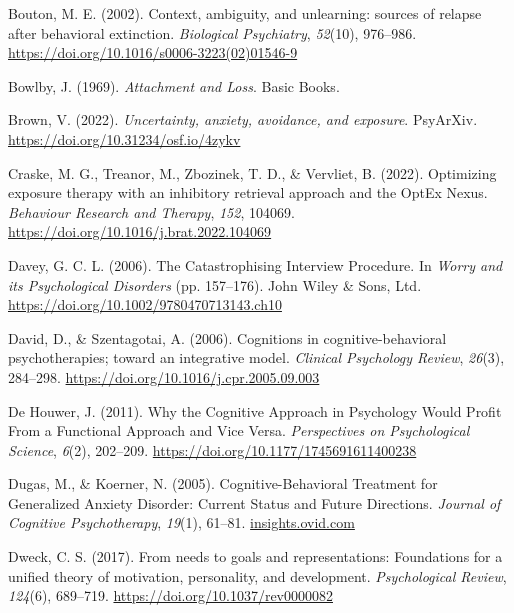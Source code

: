 \documentclass[
  man,floatsintext]{apa7}
\newlength{\cslhangindent}
\newlength{\cslentryspacingunit} %
\newenvironment{CSLReferences}[2] %
 {%
  \setlength{\parindent}{0pt}
  \ifodd #1
  \let\oldpar\par
  \def\par{\hangindent=\cslhangindent\oldpar}
  \fi
  \setlength{\parskip}{#2\cslentryspacingunit}
 }%
 {}
\begin{document}
\begin{CSLReferences}{1}{0}
\leavevmode{}%
Bouton, M. E. (2002). Context, ambiguity, and unlearning: sources of relapse after behavioral extinction. \emph{Biological Psychiatry}, \emph{52}(10), 976--986. \url{https://doi.org/10.1016/s0006-3223(02)01546-9}

\leavevmode{}%
Bowlby, J. (1969). \emph{Attachment and Loss}. Basic Books.

\leavevmode{}%
Brown, V. (2022). \emph{Uncertainty, anxiety, avoidance, and exposure}. PsyArXiv. \url{https://doi.org/10.31234/osf.io/4zykv}

\leavevmode{}%
Craske, M. G., Treanor, M., Zbozinek, T. D., \& Vervliet, B. (2022). Optimizing exposure therapy with an inhibitory retrieval approach and the OptEx Nexus. \emph{Behaviour Research and Therapy}, \emph{152}, 104069. \url{https://doi.org/10.1016/j.brat.2022.104069}

\leavevmode{}%
Davey, G. C. L. (2006). The Catastrophising Interview Procedure. In \emph{Worry and its Psychological Disorders} (pp. 157--176). John Wiley \& Sons, Ltd. \url{https://doi.org/10.1002/9780470713143.ch10}

\leavevmode{}%
David, D., \& Szentagotai, A. (2006). Cognitions in cognitive-behavioral psychotherapies; toward an integrative model. \emph{Clinical Psychology Review}, \emph{26}(3), 284--298. \url{https://doi.org/10.1016/j.cpr.2005.09.003}

\leavevmode{}%
De Houwer, J. (2011). Why the Cognitive Approach in Psychology Would Profit From a Functional Approach and Vice Versa. \emph{Perspectives on Psychological Science}, \emph{6}(2), 202--209. \url{https://doi.org/10.1177/1745691611400238}

\leavevmode{}%
Dugas, M., \& Koerner, N. (2005). Cognitive-Behavioral Treatment for Generalized Anxiety Disorder: Current Status and Future Directions. \emph{Journal of Cognitive Psychotherapy}, \emph{19}(1), 61--81. \href{https://insights.ovid.com}{insights.ovid.com}

\leavevmode{}%
Dweck, C. S. (2017). From needs to goals and representations: Foundations for a unified theory of motivation, personality, and development. \emph{Psychological Review}, \emph{124}(6), 689--719. \url{https://doi.org/10.1037/rev0000082}


\end{CSLReferences}
\end{document}

